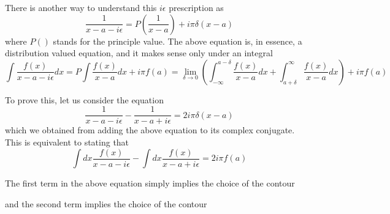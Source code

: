 \documentclass[11pt]{article}
\numberwithin{equation}{section}
\begin{document}
    There is another way to understand this \(i\epsilon\) prescription as 
    \begin{equation*}
        \frac{1}{x - a - i\epsilon} = P\left( \frac{1}{x-a} \right) + i\pi \delta(x-a)
    \end{equation*}
    where \(P()\) stands for the principle value. The above equation is, in essence, a distribution valued equation, and it makes sense only under an integral 
    \begin{equation*}
        \int \frac{f(x)}{x-a-i\epsilon} dx = P\int \frac{f(x)}{x-a} dx + i\pi f(a) =\lim_{\delta \to 0} \left(\int_{-\infty}^{a-\delta} \frac{f(x)}{x-a} dx+ \int_{a+\delta}^{\infty} \frac{f(x)}{x-a} dx \right) + i\pi f(a)
    \end{equation*}

    To prove this, let us consider the equation
    \begin{equation*}
        \frac{1}{x-a-i\epsilon} - \frac{1}{x-a+i\epsilon} = 2i\pi\delta(x-a)
    \end{equation*}
    which we obtained from adding the above equation to its complex conjugate.\\
    This is equivalent to stating that 
    \begin{equation*}
        \int dx \frac{f(x)}{x-a-i\epsilon} - \int dx \frac{f(x)}{x-a+i\epsilon} = 2i\pi f(a)
    \end{equation*}

    The first term in the above equation simply implies the choice of the contour 
    \begin{figure}[h]
        \centering
    \end{figure}

    and the second term implies the choice of the contour 
    \begin{figure}[h]
        \centering
    \end{figure}
\end{document}
